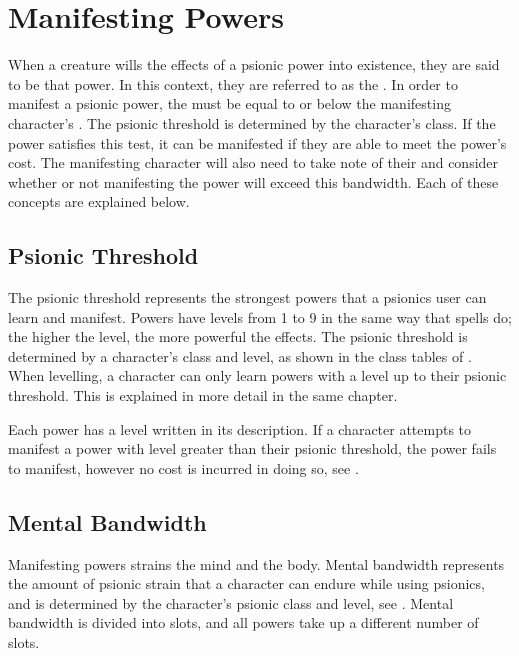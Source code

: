 \section{Manifesting Powers}
\label{sec:manifesting_powers}
When a creature wills the effects of a psionic power
into existence,
they are said to be  that power.
In this context,
they are referred to as the .
In order to manifest a psionic power,
the  must be equal to or below
the manifesting character's .
The psionic threshold is determined by the character's class.
If the power satisfies this test,
it can be manifested if they are able to
meet the power's  cost.
The manifesting character will also need to take note of their
 and consider
whether or not manifesting the power will exceed this bandwidth.
Each of these concepts are explained below.

\subsection{Psionic Threshold}
The psionic threshold represents the strongest powers
that a psionics user can learn and manifest.
Powers have levels from 1 to 9 in the same way that spells do;
the higher the level, the more powerful the effects.
The psionic threshold is determined by a character's class
and level,
as shown in the class tables of .
When levelling,
a character can only learn powers with a level up to
their psionic threshold.
This is explained in more detail in the same chapter.

Each power has a level written in its description.
If a character attempts to manifest a power with level
greater than their psionic threshold,
the power fails to manifest,
however no cost is incurred in doing so,
see .

\subsection{Mental Bandwidth}
\label{sub:mental_bandwidth}
Manifesting powers strains the mind and the body.
Mental bandwidth represents the amount of psionic strain that
a character can endure while using psionics,
and is determined by the character's psionic class and level,
see .
Mental bandwidth is divided into slots,
and all powers take up a different number of slots.


